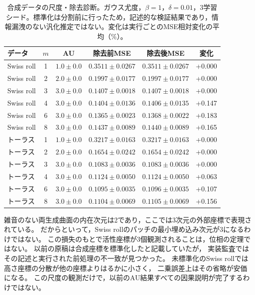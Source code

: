 \documentclass[11pt,a4paper]{ltjsarticle}
\begin{document}
\begin{table}[H]
\caption{合成データの尺度・除去診断。ガウス尤度，$\beta=1$，$\delta=0.01$，3学習シード。標準化は分割前に行ったため，記述的な検証結果であり，情報漏洩のない汎化推定ではない。変化は実行ごとのMSE相対変化の平均（\%）。}\label{tab:synthetic}
\footnotesize
\setlength{\tabcolsep}{3.5pt}
\begin{tabular*}{\textwidth}{@{\extracolsep{\fill}}lccccc@{}}
\toprule
データ & $m$ & AU & 除去前MSE & 除去後MSE & 変化 \\
\midrule
Swiss roll & 1 & $1.0 \pm 0.0$ & $0.3511 \pm 0.0267$ & $0.3511 \pm 0.0267$ & +0.000 \\
Swiss roll & 2 & $2.0 \pm 0.0$ & $0.1997 \pm 0.0177$ & $0.1997 \pm 0.0177$ & +0.000 \\
Swiss roll & 3 & $3.0 \pm 0.0$ & $0.1407 \pm 0.0018$ & $0.1407 \pm 0.0018$ & +0.000 \\
Swiss roll & 4 & $3.0 \pm 0.0$ & $0.1404 \pm 0.0136$ & $0.1406 \pm 0.0135$ & +0.147 \\
Swiss roll & 6 & $3.0 \pm 0.0$ & $0.1365 \pm 0.0023$ & $0.1368 \pm 0.0022$ & +0.183 \\
Swiss roll & 8 & $3.0 \pm 0.0$ & $0.1437 \pm 0.0089$ & $0.1440 \pm 0.0089$ & +0.165 \\
トーラス & 1 & $1.0 \pm 0.0$ & $0.3217 \pm 0.0163$ & $0.3217 \pm 0.0163$ & +0.000 \\
トーラス & 2 & $2.0 \pm 0.0$ & $0.1654 \pm 0.0242$ & $0.1654 \pm 0.0242$ & +0.000 \\
トーラス & 3 & $3.0 \pm 0.0$ & $0.1083 \pm 0.0036$ & $0.1083 \pm 0.0036$ & +0.000 \\
トーラス & 4 & $3.0 \pm 0.0$ & $0.1124 \pm 0.0050$ & $0.1124 \pm 0.0050$ & +0.063 \\
トーラス & 6 & $3.0 \pm 0.0$ & $0.1095 \pm 0.0035$ & $0.1096 \pm 0.0035$ & +0.107 \\
トーラス & 8 & $3.0 \pm 0.0$ & $0.1104 \pm 0.0069$ & $0.1105 \pm 0.0069$ & +0.156 \\
\bottomrule
\end{tabular*}
\end{table}

雑音のない両生成曲面の内在次元は2であり，ここでは3次元の外部座標で表現されている。
だからといって，Swiss rollのパッチの最小埋め込み次元が3になるわけではない。
この損失のもとで活性座標が3個観測されることは，位相の定理ではない。
以前の原稿は合成座標を標準化したと記載していたが，
実装監査ではその記述と実行された前処理の不一致が見つかった。
未標準化のSwiss rollでは高さ座標の分散が他の座標よりはるかに小さく，
二乗誤差上はその省略が安価になる。
この尺度の観測だけで，以前のAU結果すべての因果説明が完了するわけではない。
\end{document}
